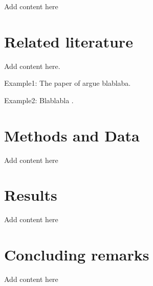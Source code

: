 \documentclass[12pt,twoside]{article}
\begin{document}
Add content here


\section{Related literature}

Add content here.


Example1: The paper of \cite{Acemoglu2010} argue blablaba.


Example2: Blablabla \citep{Acemoglu2010}.



\section{Methods and Data}

Add content here


\section{Results}

Add content here


\section{Concluding remarks}

Add content here




{\small


}
\end{document}

